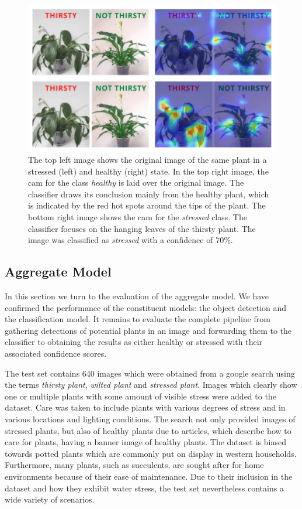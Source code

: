\documentclass[draft,final]{vutinfth} %
\begin{document}
\begin{figure}
  \centering
  \includegraphics{graphics/classifier-cam.pdf}
  \caption[Classifier \glspl{cam}.]{The top left image shows the
    original image of the same plant in a stressed (left) and healthy
    (right) state. In the top right image, the \gls{cam} for the class
    \emph{healthy} is laid over the original image. The classifier
    draws its conclusion mainly from the healthy plant, which is
    indicated by the red hot spots around the tips of the plant. The
    bottom right image shows the \gls{cam} for the \emph{stressed}
    class. The classifier focuses on the hanging leaves of the thirsty
    plant. The image was classified as \emph{stressed} with a
    confidence of 70\%.}
  \label{fig:classifier-cam}
\end{figure}


\subsection{Aggregate Model}
\label{ssec:aggregate-model}

In this section we turn to the evaluation of the aggregate model. We
have confirmed the performance of the constituent models: the object
detection and the classification model. It remains to evaluate the
complete pipeline from gathering detections of potential plants in an
image and forwarding them to the classifier to obtaining the results
as either healthy or stressed with their associated confidence scores.

The test set contains 640 images which were obtained from a google
search using the terms \emph{thirsty plant}, \emph{wilted plant} and
\emph{stressed plant}. Images which clearly show one or multiple
plants with some amount of visible stress were added to the
dataset. Care was taken to include plants with various degrees of
stress and in various locations and lighting conditions. The search
not only provided images of stressed plants, but also of healthy
plants due to articles, which describe how to care for plants, having
a banner image of healthy plants. The dataset is biased towards potted
plants which are commonly put on display in western
households. Furthermore, many plants, such as succulents, are sought
after for home environments because of their ease of maintenance. Due
to their inclusion in the dataset and how they exhibit water stress,
the test set nevertheless contains a wide variety of scenarios.
\end{document}
